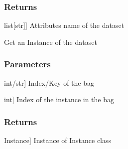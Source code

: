 \documentclass[letterpaper,10pt,english]{sphinxmanual}
\begin{document}
\begin{fulllineitems}
\begin{fulllineitems}
\subsubsection{Returns}
\label{\detokenize{data/_autosummary/miml.data.miml_dataset.MIMLDataset:id16}}\begin{description}
\sphinxlineitem{attributes}{[}list{[}str{]}{]}
\sphinxAtStartPar
Attributes name of the dataset

\end{description}

\end{fulllineitems}


\begin{fulllineitems}
\label{\detokenize{data/_autosummary/miml.data.miml_dataset.MIMLDataset:miml.data.miml_dataset.MIMLDataset.get_instance}}
\pysigstartsignatures
{}
\pysigstopsignatures
\sphinxAtStartPar
Get an Instance of the dataset


\subsubsection{Parameters}
\label{\detokenize{data/_autosummary/miml.data.miml_dataset.MIMLDataset:id17}}\begin{description}
\sphinxlineitem{bag}{[}int/str{]}
\sphinxAtStartPar
Index/Key of the bag

\sphinxlineitem{index\_instance}{[}int{]}
\sphinxAtStartPar
Index of the instance in the bag

\end{description}


\subsubsection{Returns}
\label{\detokenize{data/_autosummary/miml.data.miml_dataset.MIMLDataset:id18}}\begin{description}
\sphinxlineitem{instance}{[}Instance{]}
\sphinxAtStartPar
Instance of Instance class


\end{description}
\end{fulllineitems}
\end{fulllineitems}
\end{document}

